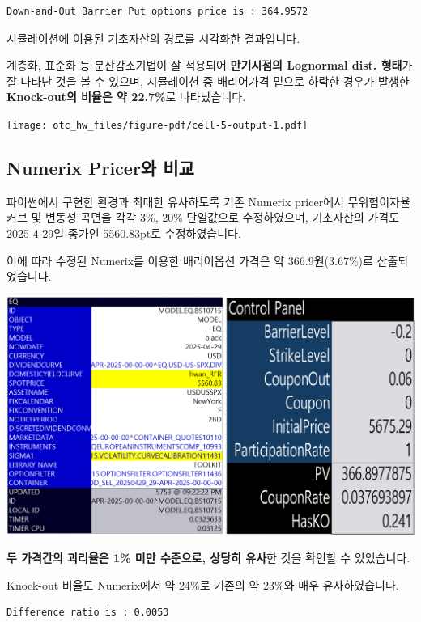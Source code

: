 \documentclass[
  a4paper,
  DIV=11,
  numbers=noendperiod]{scrreprt}
\begin{document}
\begin{verbatim}
Down-and-Out Barrier Put options price is : 364.9572
\end{verbatim}

시뮬레이션에 이용된 기초자산의 경로를 시각화한 결과입니다.

계층화, 표준화 등 분산감소기법이 잘 적용되어 \textbf{만기시점의
Lognormal dist. 형태}가 잘 나타난 것을 볼 수 있으며, 시뮬레이션 중
배리어가격 밑으로 하락한 경우가 발생한 \textbf{Knock-out의 비율은 약
22.7\%}로 나타났습니다.

\texttt{[image: otc\_hw\_files/figure-pdf/cell-5-output-1.pdf]}

\subsection*{Numerix Pricer와
비교}\label{numerix-priceruxc640-uxbe44uxad50}

파이썬에서 구현한 환경과 최대한 유사하도록 기존 Numerix pricer에서
무위험이자율 커브 및 변동성 곡면을 각각 3\%, 20\% 단일값으로
수정하였으며, 기초자산의 가격도 2025-4-29일 종가인 5560.83pt로
수정하였습니다.

이에 따라 수정된 Numerix를 이용한 배리어옵션 가격은 약 366.9원(3.67\%)로
산출되었습니다.

\includegraphics{image/numerix_pricer.png}

\textbf{두 가격간의 괴리율은 1\% 미만 수준으로, 상당히 유사}한 것을
확인할 수 있었습니다.

Knock-out 비율도 Numerix에서 약 24\%로 기존의 약 23\%와 매우
유사하였습니다.

\begin{verbatim}
Difference ratio is : 0.0053
\end{verbatim}
\end{document}
